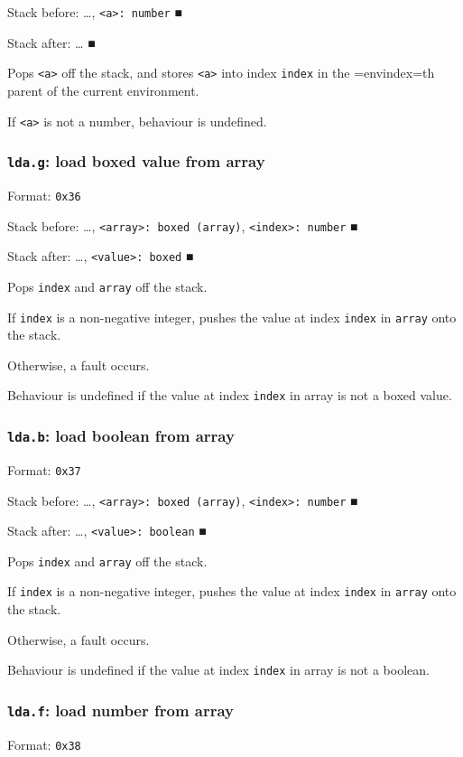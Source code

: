 Stack before: \ldots{}​, \texttt{<a>: number} ■

Stack after: \ldots{}​ ■

Pops \texttt{<a>} off the stack, and stores \texttt{<a>} into index \texttt{index} in the
=envindex=th parent of the current environment.

If \texttt{<a>} is not a number, behaviour is undefined.

\subsubsection{\texttt{lda.g}: load boxed value from array}
\label{sec:org0b3a1ff}
Format: \texttt{0x36}

Stack before: \ldots{}​, \texttt{<array>: boxed (array)}, \texttt{<index>: number} ■

Stack after: \ldots{}​, \texttt{<value>: boxed} ■

Pops \texttt{index} and \texttt{array} off the stack.

If \texttt{index} is a non-negative integer, pushes the value at index \texttt{index}
in \texttt{array} onto the stack.

Otherwise, a fault occurs.

Behaviour is undefined if the value at index \texttt{index} in array is not a
boxed value.

\subsubsection{\texttt{lda.b}: load boolean from array}
\label{sec:orgb1de169}
Format: \texttt{0x37}

Stack before: \ldots{}​, \texttt{<array>: boxed (array)}, \texttt{<index>: number} ■

Stack after: \ldots{}​, \texttt{<value>: boolean} ■

Pops \texttt{index} and \texttt{array} off the stack.

If \texttt{index} is a non-negative integer, pushes the value at index \texttt{index}
in \texttt{array} onto the stack.

Otherwise, a fault occurs.

Behaviour is undefined if the value at index \texttt{index} in array is not a
boolean.

\subsubsection{\texttt{lda.f}: load number from array}
\label{sec:orgdc8e9a7}
Format: \texttt{0x38}

